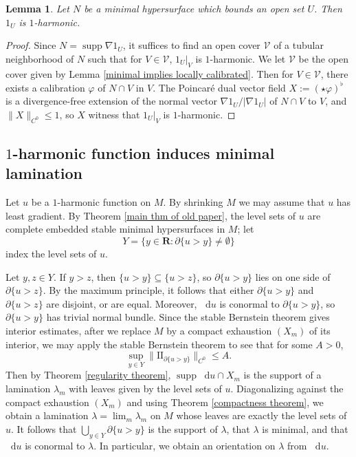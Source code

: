 \documentclass[reqno,11pt]{amsart}
\newcommand{\RR}{\mathbf{R}}
\newcommand*\dif{\mathop{}\!\mathrm{d}}
\DeclareMathOperator{\supp}{supp}
\newcommand{\Two}{\mathrm{I\!I}}
\newtheorem{lemma}[theorem]{Lemma}
\theoremstyle{definition}
\numberwithin{equation}{section}
\begin{document}
\begin{lemma}\label{minimal implies 1 harmonic}
Let $N$ be a minimal hypersurface which bounds an open set $U$.
Then $1_U$ is $1$-harmonic.
\end{lemma}
\begin{proof}
Since $N = \supp \nabla 1_U$, it suffices to find an open cover $\mathcal V$ of a tubular neighborhood of $N$ such that for $V \in \mathcal V$, $1_U|_V$ is $1$-harmonic.
We let $\mathcal V$ be the open cover given by Lemma \ref{minimal implies locally calibrated}.
Then for $V \in \mathcal V$, there exists a calibration $\varphi$ of $N \cap V$ in $V$.
The Poincar\'e dual vector field $X := (\star \varphi)^\flat$ is a divergence-free extension of the normal vector $\nabla 1_U/|\nabla 1_U|$ of $N \cap V$ to $V$, and $\|X\|_{C^0} \leq 1$, so $X$ witness that $1_U|_V$ is $1$-harmonic.
\end{proof}



\subsection{\texorpdfstring{$1$-harmonic}{One-harmonic} function induces minimal lamination}
Let $u$ be a $1$-harmonic function on $M$.
By shrinking $M$ we may assume that $u$ has least gradient.
By Theorem \ref{main thm of old paper}, the level sets of $u$ are complete embedded stable minimal hypersurfaces in $M$; let
$$Y = \{y \in \RR: \partial \{u > y\} \neq \emptyset\}$$
index the level sets of $u$.

Let $y, z \in Y$. If $y > z$, then $\{u > y\} \subseteq \{u > z\}$, so $\partial \{u > y\}$ lies on one side of $\partial \{u > z\}$.
By the maximum principle, it follows that either $\partial \{u > y\}$ and $\partial \{u > z\}$ are disjoint, or are equal.
Moreover, $\dif u$ is conormal to $\partial \{u > y\}$, so $\partial \{u > y\}$ has trivial normal bundle.
Since the stable Bernstein theorem gives interior estimates, after we replace $M$ by a compact exhaustion $(X_m)$ of its interior, we may apply the stable Bernstein theorem to see that for some $A > 0$,
\begin{equation}\label{curvature estimate on 1 harmonic}
	\sup_{y \in Y} \|\Two_{\partial \{u > y\}}\|_{C^0} \leq A.
\end{equation}
Then by Theorem \ref{regularity theorem}, $\supp \dif u \cap X_m$ is the support of a lamination $\lambda_m$ with leaves given by the level sets of $u$.
Diagonalizing against the compact exhaustion $(X_m)$ and using Theorem \ref{compactness theorem}, we obtain a lamination $\lambda = \lim_m \lambda_m$ on $M$ whose leaves are exactly the level sets of $u$.
It follows that $\bigcup_{y \in Y} \partial \{u > y\}$ is the support of $\lambda$, that $\lambda$ is minimal, and that $\dif u$ is conormal to $\lambda$.
In particular, we obtain an orientation on $\lambda$ from $\dif u$.
\end{document}
